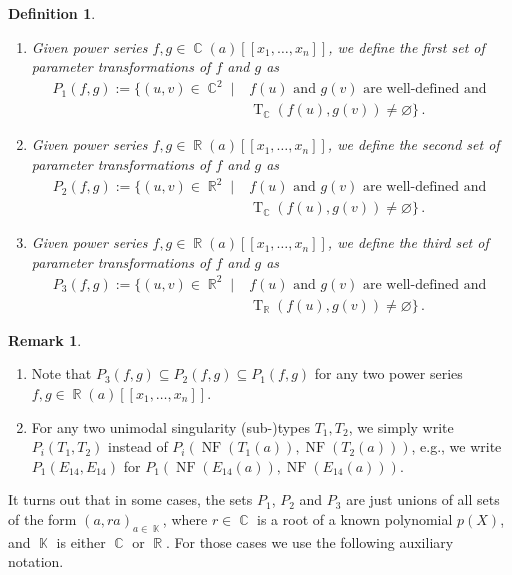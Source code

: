 \documentclass[noend]{amsproc}
\newtheorem{defn}[theorem]{Definition}
\theoremstyle{definition}
\newtheorem{remark}[theorem]{Remark}
\newcommand{\NF}[1]{\operatorname{NF}(#1)}
\DeclareMathOperator{\R}{\mathbb{R}}
\DeclareMathOperator{\C}{\mathbb{C}}
\DeclareMathOperator{\K}{\mathbb{K}}
\DeclareMathOperator{\T}{T}
\begin{document}
\begin{defn}
\phantom{X}\hfill
\begin{enumerate}
\item
Given power series $f,g \in \C(a)[[x_1,\ldots,x_n]]$, we define the
first set of parameter transformations of $f$ and $g$ as
\begin{align*}
P_1(f, g)
:= \{ (u, v) \in \C^2 \mid
&f(u) \text{ and } g(v) \text{ are well-defined and } \\
&\T_{\C}(f(u), g(v)) \neq \varnothing \} \,.
\end{align*}

\item
Given power series $f,g \in \R(a)[[x_1,\ldots,x_n]]$, we define the
second set of parameter transformations of $f$ and $g$ as
\begin{align*}
P_2(f, g)
:= \{ (u, v) \in \R^2 \mid
&f(u) \text{ and } g(v) \text{ are well-defined and } \\
&\T_{\C}(f(u), g(v)) \neq \varnothing \} \,.
\end{align*}

\item
Given power series $f,g \in \R(a)[[x_1,\ldots,x_n]]$, we define the
third set of parameter transformations of $f$ and $g$ as
\begin{align*}
P_3(f, g)
:= \{ (u, v) \in \R^2 \mid
&f(u) \text{ and } g(v) \text{ are well-defined and } \\
&\T_{\R}(f(u), g(v)) \neq \varnothing \} \,.
\end{align*}
\end{enumerate}
\end{defn}

\begin{remark}
\phantom{X}\hfill
\begin{enumerate}
\item
Note that $P_3(f, g) \subseteq P_2(f, g) \subseteq P_1(f, g)$ for any two power
series $f,g \in \R(a)[[x_1,\ldots,x_n]]$.

\item
For any two unimodal singularity (sub-)types $T_1, T_2$, we simply write
$P_i(T_1,T_2)$ instead of $P_i(\NF{T_1(a)}, \NF{T_2(a)})$, e.g., we write
$P_1(E_{14}, E_{14})$ for $P_1(\NF{E_{14}(a)}, \NF{E_{14}(a)})$.
\end{enumerate}
\end{remark}

It turns out that in some cases, the sets $P_1$, $P_2$ and $P_3$ are just
unions of all sets of the form $(a, ra)_{a \in \K}$, where $r \in \C$ is a root of a known polynomial $p(X)$, and $\K$ is
either $\C$ or $\R$. For those cases we use the following auxiliary notation.
\end{document}
